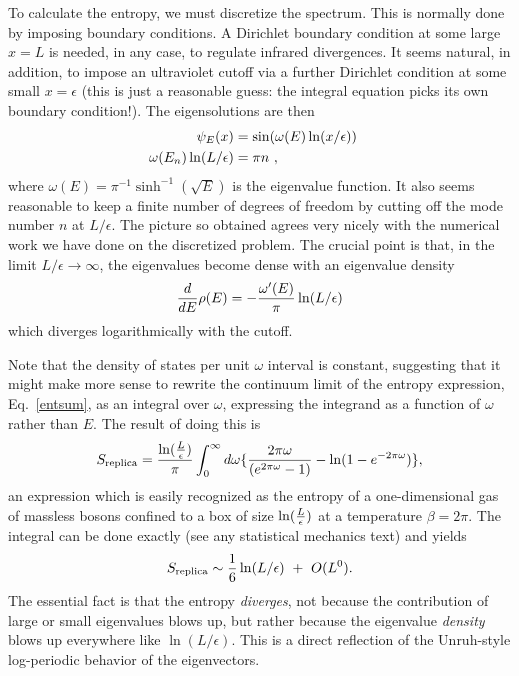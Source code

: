 \documentclass[12pt]{article}
\begin{document}
To calculate the entropy, we must discretize the spectrum. This is normally
done by imposing boundary conditions. A Dirichlet
boundary condition at some large $x=L$ is needed, in any case, to regulate
infrared divergences. It seems natural, in addition, to impose
an ultraviolet cutoff via a further Dirichlet condition at
some small $x=\epsilon$ (this is just a reasonable guess: the integral
equation picks its own boundary condition!). The eigensolutions are then
\begin{align}
\psi_E(x) &= \sin(\omega(E) \ln(x/\epsilon))\cr
\omega(E_n)\ln(L/\epsilon) &= \pi n ~,
\end{align}
where $\omega(E)=\pi^{-1}\sinh^{-1}(\sqrt{E})$ is the eigenvalue
function. It also seems reasonable to keep a finite number of degrees of
freedom by cutting off the mode number $n$ at $L/\epsilon$. The picture so
obtained agrees very nicely with the numerical work we have done on the
discretized problem. The crucial point is that, in the limit
$L/\epsilon\to\infty$, the eigenvalues become dense with an eigenvalue density
\begin{equation}
{d\over dE} \rho(E) =
    -{\omega^\prime(E)\over\pi}\ln(L/\epsilon)
\end{equation}
which diverges logarithmically with the cutoff.

Note that the density of
states per unit $\omega$ interval is constant, suggesting that it might
make more sense to rewrite the continuum limit of the entropy expression,
Eq.~\ref{entsum}, as an integral over $\omega$, expressing the integrand as
a function of $\omega$ rather than $E$. The result of doing this is
\begin{equation}
S_{{\rm replica}} = {\ln({L\over\epsilon})\over\pi}\int_0^\infty d\omega
\{
{2\pi\omega\over(e^{2\pi\omega}-1)}-\ln(1-e^{-2\pi\omega})\},
\label{rindent}
\end{equation}
an expression which is easily recognized as the entropy of a one-dimensional
gas of massless bosons
confined to a box of size $\ln({L\over\epsilon})$ at a temperature
$\beta=2\pi$.
The integral can be done exactly (see any statistical mechanics text) and
yields
\begin{equation}
	S_{\rm replica}\sim {1\over 6} \ln(L/\epsilon)~+~O(L^0).
\end{equation}
The essential fact is that the entropy {\it diverges}, not because the
contribution of large or small eigenvalues blows up, but rather because the
eigenvalue {\it density} blows up everywhere like $\ln(L/\epsilon)$. This
is a direct reflection of the Unruh-style log-periodic behavior of the
eigenvectors.
\end{document}
